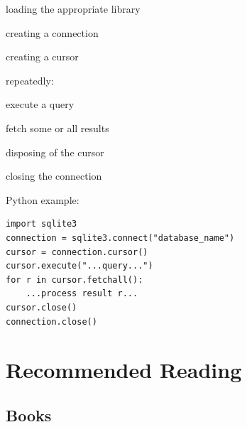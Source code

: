 \documentclass{book}
\begin{document}
\begin{swcitemize}
\item
  loading the appropriate library
\item
  creating a connection
\item
  creating a cursor
\item
  repeatedly:

  \begin{swcitemize2}
  \item
    execute a query
  \item
    fetch some or all results
   \end{swcitemize2}
\item
  disposing of the cursor
\item
  closing the connection
\end{swcitemize}

Python example:

\begin{verbatim}
import sqlite3
connection = sqlite3.connect("database_name")
cursor = connection.cursor()
cursor.execute("...query...")
for r in cursor.fetchall():
    ...process result r...
cursor.close()
connection.close()
\end{verbatim}

\chapter{Recommended Reading}\label{s:bib}

\section{Books}
\end{document}
